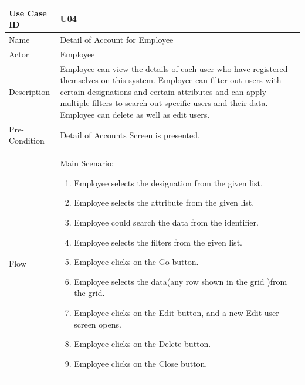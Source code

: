 \documentclass[12pt,a4paper]{report}
\begin{document}
\begin{tabular}{ | m{3cm} | m{12cm}| } \hline

Use Case ID & U04  \\\hline

Name  	    & Detail of Account for Employee  \\ \hline

Actor     	& Employee\\ \hline

Description &  Employee can view the details of each user who have registered themselves on this system. Employee can filter out users with certain designations and certain attributes and can apply multiple filters to search out specific users and  their data. Employee can delete as well as edit users.\\ \hline

Pre-Condition &  Detail of Accounts Screen is presented. \\ \hline

Flow       & Main Scenario:

\begin{enumerate}
\item  Employee selects the designation from the given list.
\item  Employee selects the attribute from the given list. 
\item  Employee could search the data from the identifier.
\item  Employee selects the filters from the given list.
\item  Employee clicks on the Go button.
\item  Employee selects the data(any row shown in the grid )from the grid. 
\item  Employee clicks on the Edit button, and a new Edit user screen opens.
\item  Employee clicks on the Delete button.
\item  Employee clicks on the Close button.


\end{enumerate}\\ \hline
\end{tabular}
\end{document}
